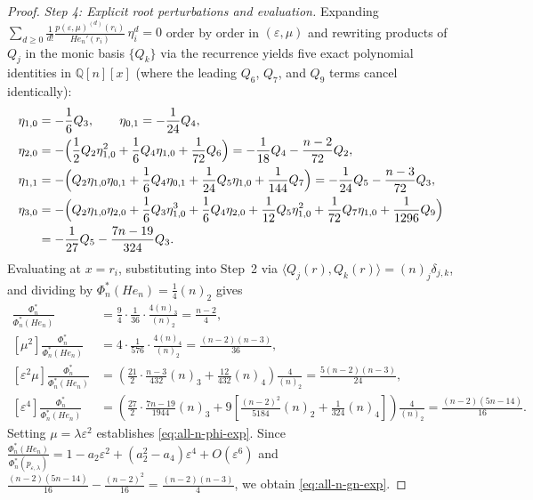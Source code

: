 \documentclass[11pt,a4paper]{article}
\theoremstyle{definition}
\begin{document}
\begin{proof}
\emph{Step 4: Explicit root perturbations and evaluation.}
Expanding $\sum_{d \ge 0} \frac{1}{d!}\frac{p(\varepsilon,\mu)^{(d)}(r_i)}{He_n'(r_i)}\,\eta_i^d = 0$ order by order in $(\varepsilon,\mu)$ and rewriting products of $Q_j$ in the monic basis $\{Q_k\}$ via the recurrence yields five exact polynomial identities in $\mathbb{Q}[n][x]$ (where the leading $Q_6$, $Q_7$, and $Q_9$ terms cancel identically):
\begin{align*}
\eta_{1,0} &= -\frac{1}{6}Q_3, \qquad \eta_{0,1} = -\frac{1}{24}Q_4, \\
\eta_{2,0} &= -\Bigl(\frac{1}{2}Q_2\eta_{1,0}^2 + \frac{1}{6}Q_4\eta_{1,0} + \frac{1}{72}Q_6\Bigr) = -\frac{1}{18}Q_4 - \frac{n-2}{72}Q_2, \\
\eta_{1,1} &= -\Bigl(Q_2\eta_{1,0}\eta_{0,1} + \frac{1}{6}Q_4\eta_{0,1} + \frac{1}{24}Q_5\eta_{1,0} + \frac{1}{144}Q_7\Bigr) = -\frac{1}{24}Q_5 - \frac{n-3}{72}Q_3, \\
\eta_{3,0} &= -\Bigl(Q_2\eta_{1,0}\eta_{2,0} + \frac{1}{6}Q_3\eta_{1,0}^3 + \frac{1}{6}Q_4\eta_{2,0} + \frac{1}{12}Q_5\eta_{1,0}^2 + \frac{1}{72}Q_7\eta_{1,0} + \frac{1}{1296}Q_9\Bigr) \\
&= -\frac{1}{27}Q_5 - \frac{7n-19}{324}Q_3.
\end{align*}
Evaluating at $x = r_i$, substituting into Step~2 via $\langle Q_j(r), Q_k(r)\rangle = (n)_j\delta_{j,k}$, and dividing by $\Phi_n^*(He_n) = \frac{1}{4}(n)_2$ gives
\begin{align*}
[\varepsilon^2]\frac{\Phi_n^*}{\Phi_n^*(He_n)} &= \frac{9}{4}\cdot\frac{1}{36}\cdot\frac{4(n)_3}{(n)_2} = \frac{n-2}{4}, \\
[\mu^2]\frac{\Phi_n^*}{\Phi_n^*(He_n)} &= 4\cdot\frac{1}{576}\cdot\frac{4(n)_4}{(n)_2} = \frac{(n-2)(n-3)}{36}, \\
[\varepsilon^2\mu]\frac{\Phi_n^*}{\Phi_n^*(He_n)} &= \left(\frac{21}{2}\cdot\frac{n-3}{432}(n)_3 + \frac{12}{432}(n)_4\right)\frac{4}{(n)_2} = \frac{5(n-2)(n-3)}{24}, \\
[\varepsilon^4]\frac{\Phi_n^*}{\Phi_n^*(He_n)} &= \left(\frac{27}{2}\cdot\frac{7n-19}{1944}(n)_3 + 9\left[\frac{(n-2)^2}{5184}(n)_2 + \frac{1}{324}(n)_4\right]\right)\frac{4}{(n)_2} = \frac{(n-2)(5n-14)}{16}.
\end{align*}
Setting $\mu = \lambda\varepsilon^2$ establishes \eqref{eq:all-n-phi-exp}. Since $\frac{\Phi_n^*(He_n)}{\Phi_n^*(p_{\varepsilon,\lambda})} = 1 - a_2\varepsilon^2 + (a_2^2 - a_4)\varepsilon^4 + O(\varepsilon^6)$ and $\frac{(n-2)(5n-14)}{16} - \frac{(n-2)^2}{16} = \frac{(n-2)(n-3)}{4}$, we obtain \eqref{eq:all-n-gn-exp}.


\end{proof}
\end{document}
